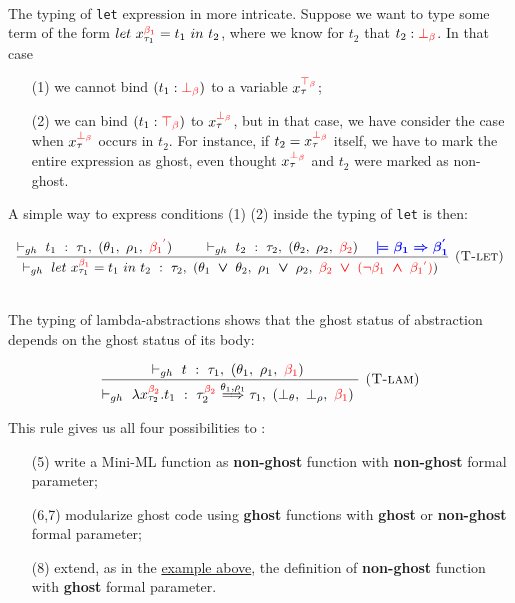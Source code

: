 \documentclass[a4paper,11pt,oneside]{article}
\theoremstyle{plain}
\newcommand{\rouge}[1]{\textcolor{red}{#1}}
\newcommand{\bwedge}{\boldsymbol{~\wedge~}}
\newcommand{\bvee}{\boldsymbol{~\vee~}}
\newcommand{\ghosttyping}[6]{\vdash_{gh}~#1~:~#2,~(#3,~#4,~\rouge{#5})~\textcolor{blue}{\boldsymbol{#6}}}
\newcommand{\bth}{\bot_\theta}
\newcommand{\brh}{\bot_\rho}
\newcommand{\gba}[1]{\beta_{#1}}
\newcommand{\gbb}{\bot_\beta}
\newcommand{\gbt}{\top_\beta}
\newcommand{\gbra}[1]{\textcolor{red}{\gba{#1}}}
\newcommand{\gbbr}{\textcolor{red}{\gbb}}
\newcommand{\gbtr}{\textcolor{red}{\gbt}}
\newcommand{\gbran}[1]{\textcolor{red}{\neg\gba{#1}}}
\begin{document}
~\\
The typing of \texttt{let} expression in more intricate.
Suppose we want to type some term of the form $let~x^{\gbra{1}}_{\tau_1} = t_1~in~t_2$, where we know for $t_2$ that $t_2:\gbbr$.
In that case
\begin{itemize}
\item[(1)] we cannot bind $(t_1: \gbbr)$ to a variable $x_{\tau}^{\gbtr}$; 
\item[(2)] we can bind $(t_1: \gbtr)$ to $x_{\tau}^{\gbbr}$, but in that case, we have  consider the case when $x_{\tau}^{\gbbr}$ occurs in $t_2$. 
For instance, if $t_2 = x_{\tau}^{\gbbr}$ itself, we have to mark the entire expression as ghost, even thought $x_{\tau}^{\gbbr}$ and $ t_2$ were marked as non-ghost.   
\end{itemize}
A simple way to express conditions (1) (2) inside the typing of \texttt{let} is then: 
\begin{footnotesize}	
\begin{displaymath}
\begin{array}{l}
\dfrac
	{
		\ghosttyping
			{t_1}
			{\tau_1}
			{\theta_1}
			{\rho_1}
			{\gbra{1}^{\rouge{'}}}
			{} \qquad
		\ghosttyping
			{t_2}
			{\tau_2}
			{\theta_2}
			{\rho_2}
			{\gbra{2}}
			{  \quad \models \gba{1} \Rightarrow \gba{1}^{'}}
	}
	{\ghosttyping
		{let~x^{\gbra{1}}_{\tau_1} = t_1~in~t_2}
		{\tau_2}
		{\theta_1 \bvee \theta_2}
		{\rho_1 \bvee \rho_2}
		{\gbra{2} \bvee (\gbran{1} \bwedge \gbra{1}^{\rouge{'}})}
		{}}
	{\textsc{  (T-let)}}
	\end{array}	
\end{displaymath}
\end{footnotesize}	
~\\
The typing of lambda-abstractions shows that the ghost status of abstraction depends on the ghost status of its body:
\begin{footnotesize}	
\begin{displaymath}
\begin{array}{l}
\dfrac
	{\ghosttyping
		{t}
		{\tau_1}
		{\theta_1}
		{\rho_1}
		{\gbra{1}}
		{}}
	{\ghosttyping
		{\lambda x^{\gbra{2}}_{\tau_2} . t_1}
		{\tau_{2}^{\gbra{2}} \stackrel{\theta_1, \rho_1}{\Longrightarrow} \tau_1}
		{\bth}
		{\brh}
		{\gbra{1}}
		{}}
	{\textsc{  (T-lam)}}
\end{array}	
\end{displaymath}
\end{footnotesize}	
This rule gives us all four possibilities to :
\begin{itemize}
\item[(5)] write a Mini-ML function as \textbf{non-ghost} function with \textbf{non-ghost} formal parameter; 

\item[(6,7)] modularize ghost code using \textbf{ghost} functions with \textbf{ghost} or \textbf{non-ghost} formal parameter; 

\item[(8)] extend, as in the \hyperlink{list-iter}{example above}, the definition of \textbf{non-ghost} function with \textbf{ghost} formal parameter.
\end{itemize}
~\\
\end{document}
